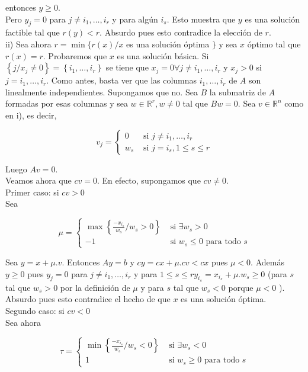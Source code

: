 \documentclass[10pt]{article}
\begin{document}
entonces $y \geq 0$.\\
Pero $y_{j}=0$ para $j \neq i_{1}, \ldots, i_{r}$ y para algún $i_{s}$. Esto muestra que $y$ es una solución factible tal que $r(y)<r$. Absurdo pues esto contradice la elección de $r$.\\
ii) Sea ahora $r=\min \{r(x) / x$ es una solución óptima $\}$ y sea $x$ óptimo tal que $r(x)=r$. Probaremos que $x$ es una solución básica. Si $\left\{j / x_{j} \neq 0\right\}=\left\{i_{1}, \ldots, i_{r}\right\}$ se tiene que $x_{j}=0 \forall j \neq i_{1}, \ldots, i_{r}$ y $x_{j}>0$ si $j=i_{1}, \ldots, i_{r}$. Como antes, basta ver que las columnas $i_{1}, \ldots, i_{r}$ de $A$ son linealmente independientes. Supongamos que no. Sea $B$ la submatriz de $A$ formadas por esas columnas y sea $w \in \mathbb{R}^{r}, w \neq 0$ tal que $B w=0$. Sea $v \in \mathbb{R}^{n}$ como en i), es decir,

$$
v_{j}= \begin{cases}0 & \text { si } j \neq i_{1}, \ldots, i_{r} \\ w_{s} & \text { si } j=i_{s}, 1 \leq s \leq r\end{cases}
$$

Luego $A v=0$.\\
Veamos ahora que $c v=0$. En efecto, supongamos que $c v \neq 0$.\\
Primer caso: si $c v>0$\\
Sea

$$
\mu= \begin{cases}\max \left\{\frac{-x_{i_{s}}}{w_{s}} / w_{s}>0\right\} & \text { si } \exists w_{s}>0 \\ -1 & \text { si } w_{s} \leq 0 \text { para todo } s\end{cases}
$$

Sea $y=x+\mu . v$. Entonces $A y=b$ y $c y=c x+\mu . c v<c x$ pues $\mu<0$. Además $y \geq 0$ pues $y_{j}=0$ para $j \neq i_{1}, \ldots, i_{r}$ y para $1 \leq s \leq r y_{i_{s}}=x_{i_{s}}+\mu . w_{s} \geq 0$ (para $s$ tal que $w_{s}>0$ por la definición de $\mu$ y para $s$ tal que $w_{s}<0$ porque $\mu<0$ ). Absurdo pues esto contradice el hecho de que $x$ es una solución óptima.\\
Segundo caso: si $c v<0$\\
Sea ahora

$$
\tau= \begin{cases}\min \left\{\frac{-x_{i_{s}}}{w_{s}} / w_{s}<0\right\} & \text { si } \exists w_{s}<0 \\ 1 & \text { si } w_{s} \geq 0 \text { para todo } s\end{cases}
$$
\end{document}
